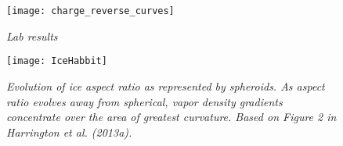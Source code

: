 \begin{figure}[H]
\centering
\texttt{[image: charge\_reverse\_curves]}
\caption{\textit{Lab results}}
\label{fig:charge_reverse_curves}
\end{figure}

\begin{figure}[H]
\centering
\texttt{[image: IceHabbit]}
\caption{\textit{Evolution of ice aspect ratio as represented by spheroids. As aspect ratio evolves away from spherical, vapor density gradients concentrate over the area of greatest curvature. Based on Figure 2 in Harrington et al. (2013a).}}
\label{fig:icehabit}
\end{figure}